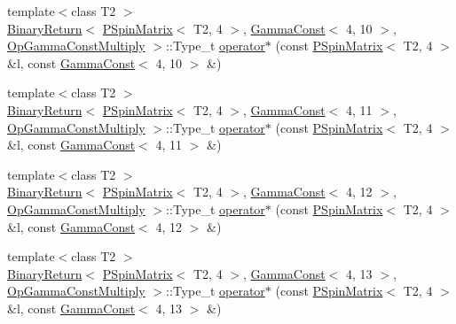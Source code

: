 \begin{DoxyCompactItemize}
\item 
{\footnotesize template$<$class T2 $>$ }\\\mbox{\hyperlink{structENSEM_1_1BinaryReturn}{Binary\+Return}}$<$ \mbox{\hyperlink{classENSEM_1_1PSpinMatrix}{P\+Spin\+Matrix}}$<$ T2, 4 $>$, \mbox{\hyperlink{classENSEM_1_1GammaConst}{Gamma\+Const}}$<$ 4, 10 $>$, \mbox{\hyperlink{structENSEM_1_1OpGammaConstMultiply}{Op\+Gamma\+Const\+Multiply}} $>$\+::Type\+\_\+t \mbox{\hyperlink{group__primspinmatrix_ga84b4002a13db59637f1e0b23a7382a52}{operator$\ast$}} (const \mbox{\hyperlink{classENSEM_1_1PSpinMatrix}{P\+Spin\+Matrix}}$<$ T2, 4 $>$ \&l, const \mbox{\hyperlink{classENSEM_1_1GammaConst}{Gamma\+Const}}$<$ 4, 10 $>$ \&)
\item 
{\footnotesize template$<$class T2 $>$ }\\\mbox{\hyperlink{structENSEM_1_1BinaryReturn}{Binary\+Return}}$<$ \mbox{\hyperlink{classENSEM_1_1PSpinMatrix}{P\+Spin\+Matrix}}$<$ T2, 4 $>$, \mbox{\hyperlink{classENSEM_1_1GammaConst}{Gamma\+Const}}$<$ 4, 11 $>$, \mbox{\hyperlink{structENSEM_1_1OpGammaConstMultiply}{Op\+Gamma\+Const\+Multiply}} $>$\+::Type\+\_\+t \mbox{\hyperlink{group__primspinmatrix_gaaf604778bbb015bcd9e40d133993fda3}{operator$\ast$}} (const \mbox{\hyperlink{classENSEM_1_1PSpinMatrix}{P\+Spin\+Matrix}}$<$ T2, 4 $>$ \&l, const \mbox{\hyperlink{classENSEM_1_1GammaConst}{Gamma\+Const}}$<$ 4, 11 $>$ \&)
\item 
{\footnotesize template$<$class T2 $>$ }\\\mbox{\hyperlink{structENSEM_1_1BinaryReturn}{Binary\+Return}}$<$ \mbox{\hyperlink{classENSEM_1_1PSpinMatrix}{P\+Spin\+Matrix}}$<$ T2, 4 $>$, \mbox{\hyperlink{classENSEM_1_1GammaConst}{Gamma\+Const}}$<$ 4, 12 $>$, \mbox{\hyperlink{structENSEM_1_1OpGammaConstMultiply}{Op\+Gamma\+Const\+Multiply}} $>$\+::Type\+\_\+t \mbox{\hyperlink{group__primspinmatrix_ga8c42140341467357377e412313e01a3c}{operator$\ast$}} (const \mbox{\hyperlink{classENSEM_1_1PSpinMatrix}{P\+Spin\+Matrix}}$<$ T2, 4 $>$ \&l, const \mbox{\hyperlink{classENSEM_1_1GammaConst}{Gamma\+Const}}$<$ 4, 12 $>$ \&)
\item 
{\footnotesize template$<$class T2 $>$ }\\\mbox{\hyperlink{structENSEM_1_1BinaryReturn}{Binary\+Return}}$<$ \mbox{\hyperlink{classENSEM_1_1PSpinMatrix}{P\+Spin\+Matrix}}$<$ T2, 4 $>$, \mbox{\hyperlink{classENSEM_1_1GammaConst}{Gamma\+Const}}$<$ 4, 13 $>$, \mbox{\hyperlink{structENSEM_1_1OpGammaConstMultiply}{Op\+Gamma\+Const\+Multiply}} $>$\+::Type\+\_\+t \mbox{\hyperlink{group__primspinmatrix_ga144197a9be57f3b174a39c02a6c5e03f}{operator$\ast$}} (const \mbox{\hyperlink{classENSEM_1_1PSpinMatrix}{P\+Spin\+Matrix}}$<$ T2, 4 $>$ \&l, const \mbox{\hyperlink{classENSEM_1_1GammaConst}{Gamma\+Const}}$<$ 4, 13 $>$ \&)

\end{DoxyCompactItemize}
